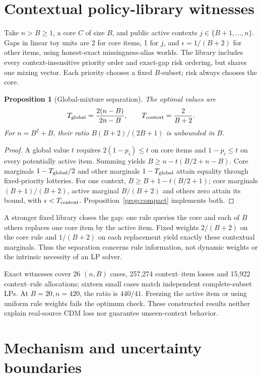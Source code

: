 \documentclass[11pt]{article}
\newtheorem{proposition}{Proposition}
\begin{document}
\clearpage
\appendix
\section{Contextual policy-library witnesses}\label{app:library}
Take $n>B\ge1$, a core $C$ of size $B$, and public active contexts
$j\in\{B+1,\ldots,n\}$. Gaps in linear toy units are 2 for core items,
1 for $j$, and $\epsilon=1/(B+2)$ for other items, using honest-exact
missingness-alias worlds. The library includes every context-insensitive
priority order and exact-gap risk ordering, but shares one mixing vector.
Each priority chooses a fixed $B$-subset; risk always chooses the core.

\begin{proposition}[Global-mixture separation]
The optimal values are
\[
 T_{\rm global}=\frac{2(n-B)}{2n-B},\qquad
 T_{\rm context}=\frac{2}{B+2}.
\]
For $n=B^2+B$, their ratio $B(B+2)/(2B+1)$ is unbounded in $B$.
\end{proposition}
\begin{proof}
A global value $t$ requires $2(1-p_i)\le t$ on core items and
$1-p_i\le t$ on every potentially active item. Summing yields
$B\ge n-t(B/2+n-B)$. Core marginals $1-T_{\rm global}/2$ and other
marginals $1-T_{\rm global}$ attain equality through fixed-priority lotteries.
For one context, $B\ge B+1-t(B/2+1)$; core marginals $(B+1)/(B+2)$,
active marginal $B/(B+2)$ and others zero attain its bound, with
$\epsilon<T_{\rm context}$. Proposition~\ref{prop:compact} implements both.
\end{proof}
A stronger fixed library closes the gap: one rule queries the core and each
of $B$ others replaces one core item by the active item. Fixed weights
$2/(B+2)$ on the core rule and $1/(B+2)$ on each replacement yield exactly
these contextual marginals. Thus the separation concerns rule information,
not dynamic weights or the intrinsic necessity of an LP solver.

Exact witnesses cover 26 $(n,B)$ cases, 257,274 context--item losses and
15,922 context--rule allocations; sixteen small cases match independent
complete-subset LPs. At $B=20,n=420$, the ratio is $440/41$. Freezing the
active item or using uniform rule weights fails the optimum check. These
constructed results neither explain real-source CDM loss nor guarantee
unseen-context behavior.

\section{Mechanism and uncertainty boundaries}\label{app:diagnostics}
\end{document}
